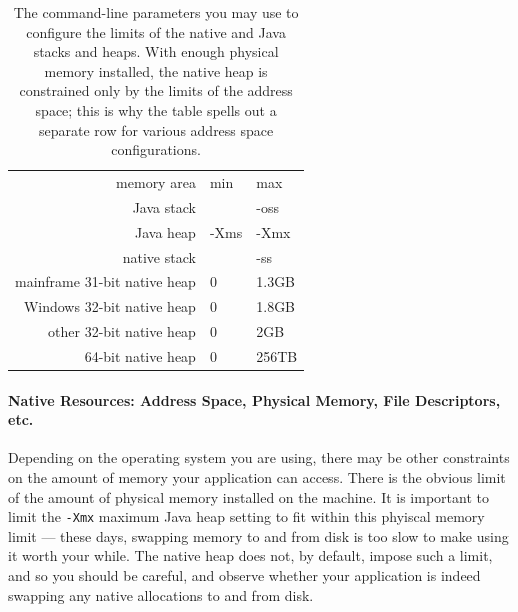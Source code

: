 \begin{table}
\centering
\begin{tabular}{rll}
\toprule
memory area & min & max \\
\cmidrule(r){1-1} \cmidrule(l){2-3}
Java stack &  & -oss \\
Java heap & -Xms & -Xmx \\
native stack & & -ss \\
mainframe 31-bit native heap & 0 & 1.3GB \\
Windows 32-bit native heap & 0 & 1.8GB \\
other 32-bit native heap & 0 & 2GB \\
64-bit native heap & 0 & 256TB \\
\bottomrule
\end{tabular}
\caption{The command-line parameters you may use to configure the limits of the
native and Java stacks and heaps. With enough physical memory installed, the
native heap is constrained only by the limits of the address space; this is why
the table spells out a separate row for various address space configurations.}
\label{tab:stack-heap-limits}
\end{table}



\paragraph{Native Resources: Address Space, Physical Memory, File Descriptors,
etc.}
Depending on the operating system you are using, there may be other constraints
on the amount of memory your application can access. There is the obvious limit
of the amount of physical memory installed on the machine. It is important to
limit the {\tt -Xmx} maximum Java heap setting to fit within this phyiscal
memory limit --- these days, swapping memory to and from disk is too slow to
make using it worth your while. The native heap does not, by default, impose
such a limit, and so you should be careful, and observe whether your application
is indeed swapping any native allocations to and from disk.

